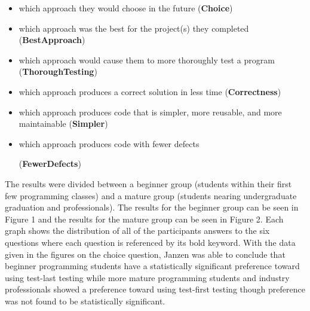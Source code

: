 \documentclass{sig-alternate}
\begin{document}
\begin{itemize}
\item which approach they would choose in the future (\textbf{Choice})
\item which approach was the best for the project(s) they
completed (\textbf{BestApproach})
\item which approach would cause them to more thoroughly
test a program (\textbf{ThoroughTesting})
\item which approach produces a correct solution in less
time (\textbf{Correctness})
\item which approach produces code that is simpler, more
reusable, and more maintainable (\textbf{Simpler})
\item which approach produces code with fewer defects

(\textbf{FewerDefects})
\end{itemize}

The results were divided between a beginner group (students within their first few programming classes) and a mature group (students nearing undergraduate graduation and professionals).  The results for the beginner group can be seen in Figure 1 and the results for the mature group can be seen in Figure 2.  Each graph shows the distribution of all of the participants answers to the six questions where each question is referenced by its bold keyword.  With the data given in the figures on the choice question, Janzen was able to conclude that beginner programming students have a statistically significant preference toward using test-last testing while more mature programming students and industry professionals showed a preference toward using test-first testing though preference was not found to be statistically significant.  
\end{document}
